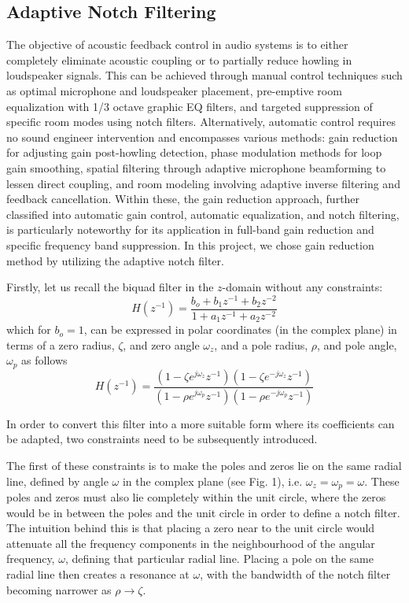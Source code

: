 \subsection{Adaptive Notch Filtering}
The objective of acoustic feedback control in audio systems is to either completely eliminate acoustic coupling or to partially reduce howling in loudspeaker signals. This can be achieved through manual control techniques such as optimal microphone and loudspeaker placement, pre-emptive room equalization with 1/3 octave graphic EQ filters, and targeted suppression of specific room modes using notch filters. Alternatively, automatic control requires no sound engineer intervention and encompasses various methods: gain reduction for adjusting gain post-howling detection, phase modulation methods for loop gain smoothing, spatial filtering through adaptive microphone beamforming to lessen direct coupling, and room modeling involving adaptive inverse filtering and feedback cancellation. Within these, the gain reduction approach, further classified into automatic gain control, automatic equalization, and notch filtering, is particularly noteworthy for its application in full-band gain reduction and specific frequency band suppression. In this project, we chose gain reduction method by utilizing the adaptive notch filter.

Firstly, let us recall the biquad filter in the $z$-domain without any constraints:
\begin{equation}
    H\left(z^{-1}\right)=\frac{b_o+b_1 z^{-1}+b_2 z^{-2}}{1+a_1 z^{-1}+a_2 z^{-2}}
\end{equation}
which for $b_o=1$, can be expressed in polar coordinates (in the complex plane) in terms of a zero radius, $\zeta$, and zero angle $\omega_z$, and a pole radius, $\rho$, and pole angle, $\omega_p$ as follows
\begin{equation}
    H\left(z^{-1}\right)=\frac{\left(1-\zeta e^{j \omega_z} z^{-1}\right)\left(1-\zeta e^{-j \omega_z} z^{-1}\right)}{\left(1-\rho e^{j \omega_p} z^{-1}\right)\left(1-\rho e^{-j \omega_p} z^{-1}\right)}
\end{equation}

In order to convert this filter into a more suitable form where its coefficients can be adapted, two constraints need to be subsequently introduced.

The first of these constraints is to make the poles and zeros lie on the same radial line, defined by angle $\omega$ in the complex plane (see Fig. 1), i.e. $\omega_z=\omega_p=\omega$. These poles and zeros must also lie completely within the unit circle, where the zeros would be in between the poles and the unit circle in order to define a notch filter. The intuition behind this is that placing a zero near to the unit circle would attenuate all the frequency components in the neighbourhood of the angular frequency, $\omega$, defining that particular radial line. Placing a pole on the same radial line then creates a resonance at $\omega$, with the bandwidth of the notch filter becoming narrower as $\rho \rightarrow \zeta$.

